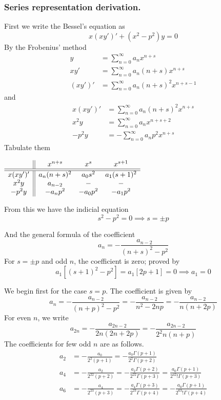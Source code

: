 \documentclass[../main.tex]{subfiles}
\begin{document}
\subsubsection*{Series representation derivation.} First we write the Bessel's equation as 
\begin{equation*}
    x(xy')'+ (x^2-p^2)y=0
\end{equation*}
By the Frobenius' method
\begin{align*}
    y&=\sum_{n=0}^{\infty} a_nx^{n+s}\\
    xy'&=\sum_{n=0}^{\infty} a_n(n+s) x^{n+s}\\
    (xy')'&=\sum_{n=0}^{\infty} a_n(n+s)^2 x^{n+s-1}
\end{align*}
and 
\begin{align*}
    x(xy')'&=\sum_{n=0}^{\infty} a_n(n+s)^2 x^{n+s}\\
    x^2y&=\sum_{n=0}^{\infty} a_n x^{n+s+2}\\
    -p^2y&=-\sum_{n=0}^{\infty} a_np^2x^{n+s}
\end{align*}
Tabulate them
\begin{center}
$\begin{array}{c || c c c}
  &x^{n+s}&x^s&x^{s+1}\\
  \hline\hline
  x(xy')' &a_n(n+s)^2 &a_0s^2 &a_1(s+1)^2\\
  x^2y &a_{n-2}&- &-\\
  -p^2y &-a_np^2&-a_0p^2&-a_1p^2
\end{array}$
\end{center}

From this we have the indicial equation
\begin{equation*}
    s^2-p^2=0\implies s=\pm p
\end{equation*}

And the general formula of the coefficient
\begin{equation*}
    a_n=-\frac{a_{n-2}}{(n+s)^2-p^2}
\end{equation*}
For $s=\pm p$ and odd $n$, the coefficient is zero; proved by 
\begin{equation*}
    a_1\left[(s+1)^2-p^2\right]=a_1\left[2p+1\right]=0\implies a_1=0 
\end{equation*} 

We begin first for the case $s=p$. The coefficient is given by 
\begin{equation*}
    a_n=-\frac{a_{n-2}}{(n+p)^2-p^2}=-\frac{a_{n-2}}{n^2-2np}=-\frac{a_{n-2}}{n(n+2p)}
\end{equation*}
For even $n$, we write
\begin{equation*}
    a_{2n}=-\frac{a_{2n-2}}{2n(2n+2p)}= -\frac{a_{2n-2}}{2^2n(n+p)}
\end{equation*}
The coefficients for few odd $n$ are as follows.
\begin{align*}
    a_2&=-\frac{a_0}{2^2(p+1)}=-\frac{a_0\Gamma(p+1)}{2^2\Gamma(p+2)}\\
    a_4&=-\frac{a_2}{2^22(p+2)}=-\frac{a_2\Gamma(p+2)}{2^22\Gamma(p+3)}=\frac{a_0\Gamma(p+1)}{2^42!\Gamma(p+3)}\\
    a_6&=-\frac{a_4}{2^23(p+3)}=-\frac{a_4\Gamma(p+3)}{2^23\Gamma(p+4)}=-\frac{a_0\Gamma(p+1)}{2^63!\Gamma(p+4)}
\end{align*}
\end{document}
